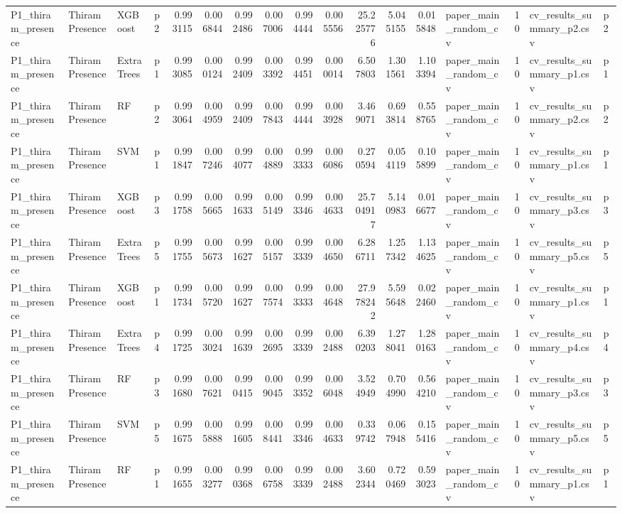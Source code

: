 \begin{tabular}{llllrrrrrrrrrlrll}
P1_thiram_presence & Thiram Presence & XGBoost & p2 & 0.993115 & 0.006844 & 0.992486 & 0.007006 & 0.994444 & 0.005556 & 25.225776 & 5.045155 & 0.015848 & paper_main_random_cv & 10 & cv_results_summary_p2.csv & p2 \\
P1_thiram_presence & Thiram Presence & ExtraTrees & p1 & 0.993085 & 0.000124 & 0.992409 & 0.003392 & 0.994451 & 0.000014 & 6.507803 & 1.301561 & 1.103394 & paper_main_random_cv & 10 & cv_results_summary_p1.csv & p1 \\
P1_thiram_presence & Thiram Presence & RF & p2 & 0.993064 & 0.004959 & 0.992409 & 0.007843 & 0.994444 & 0.003928 & 3.469071 & 0.693814 & 0.558765 & paper_main_random_cv & 10 & cv_results_summary_p2.csv & p2 \\
P1_thiram_presence & Thiram Presence & SVM & p1 & 0.991847 & 0.007246 & 0.994077 & 0.004889 & 0.993333 & 0.006086 & 0.270594 & 0.054119 & 0.105899 & paper_main_random_cv & 10 & cv_results_summary_p1.csv & p1 \\
P1_thiram_presence & Thiram Presence & XGBoost & p3 & 0.991758 & 0.005665 & 0.991633 & 0.005149 & 0.993346 & 0.004633 & 25.704917 & 5.140983 & 0.016677 & paper_main_random_cv & 10 & cv_results_summary_p3.csv & p3 \\
P1_thiram_presence & Thiram Presence & ExtraTrees & p5 & 0.991755 & 0.005673 & 0.991627 & 0.005157 & 0.993339 & 0.004650 & 6.286711 & 1.257342 & 1.134625 & paper_main_random_cv & 10 & cv_results_summary_p5.csv & p5 \\
P1_thiram_presence & Thiram Presence & XGBoost & p1 & 0.991734 & 0.005720 & 0.991627 & 0.007574 & 0.993333 & 0.004648 & 27.978242 & 5.595648 & 0.022460 & paper_main_random_cv & 10 & cv_results_summary_p1.csv & p1 \\
P1_thiram_presence & Thiram Presence & ExtraTrees & p4 & 0.991725 & 0.003024 & 0.991639 & 0.002695 & 0.993339 & 0.002488 & 6.390203 & 1.278041 & 1.280163 & paper_main_random_cv & 10 & cv_results_summary_p4.csv & p4 \\
P1_thiram_presence & Thiram Presence & RF & p3 & 0.991680 & 0.007621 & 0.990415 & 0.009045 & 0.993352 & 0.006048 & 3.524949 & 0.704990 & 0.564210 & paper_main_random_cv & 10 & cv_results_summary_p3.csv & p3 \\
P1_thiram_presence & Thiram Presence & SVM & p5 & 0.991675 & 0.005888 & 0.991605 & 0.008441 & 0.993346 & 0.004633 & 0.339742 & 0.067948 & 0.155416 & paper_main_random_cv & 10 & cv_results_summary_p5.csv & p5 \\
P1_thiram_presence & Thiram Presence & RF & p1 & 0.991655 & 0.003277 & 0.990368 & 0.006758 & 0.993339 & 0.002488 & 3.602344 & 0.720469 & 0.593023 & paper_main_random_cv & 10 & cv_results_summary_p1.csv & p1 \\

\end{tabular}
